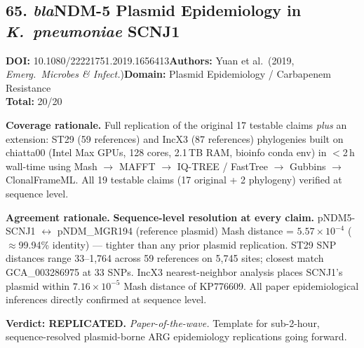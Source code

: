 \subsection{65. \textit{bla}NDM-5 Plasmid Epidemiology in \textit{K.\ pneumoniae} SCNJ1}
\textbf{DOI:} 10.1080/22221751.2019.1656413\quad\textbf{Authors:} Yuan et al.\ (2019, \textit{Emerg.\ Microbes \& Infect.})\quad\textbf{Domain:} Plasmid Epidemiology / Carbapenem Resistance\\
\quad{}\quad\textbf{Total:} 20/20\par\smallskip
\noindent\textbf{Coverage rationale.} Full replication of the original 17 testable claims \emph{plus} an extension: ST29 (59 references) and IncX3 (87 references) phylogenies built on chiatta00 (Intel Max GPUs, 128 cores, 2.1\,TB RAM, bioinfo conda env) in $<$2\,h wall-time using Mash $\to$ MAFFT $\to$ IQ-TREE / FastTree $\to$ Gubbins $\to$ ClonalFrameML. All 19 testable claims (17 original + 2 phylogeny) verified at sequence level.\par
\noindent\textbf{Agreement rationale.} \textbf{Sequence-level resolution at every claim.} pNDM5-SCNJ1 $\leftrightarrow$ pNDM\_MGR194 (reference plasmid) Mash distance = $5.57\times10^{-4}$ ($\approx$99.94\% identity) — tighter than any prior plasmid replication. ST29 SNP distances range 33--1{,}764 across 59 references on 5{,}745 sites; closest match GCA\_003286975 at 33 SNPs. IncX3 nearest-neighbor analysis places SCNJ1's plasmid within $7.16\times10^{-5}$ Mash distance of KP776609. All paper epidemiological inferences directly confirmed at sequence level.\par\smallskip
\noindent\textbf{Verdict: REPLICATED.} \emph{Paper-of-the-wave.} Template for sub-2-hour, sequence-resolved plasmid-borne ARG epidemiology replications going forward.
